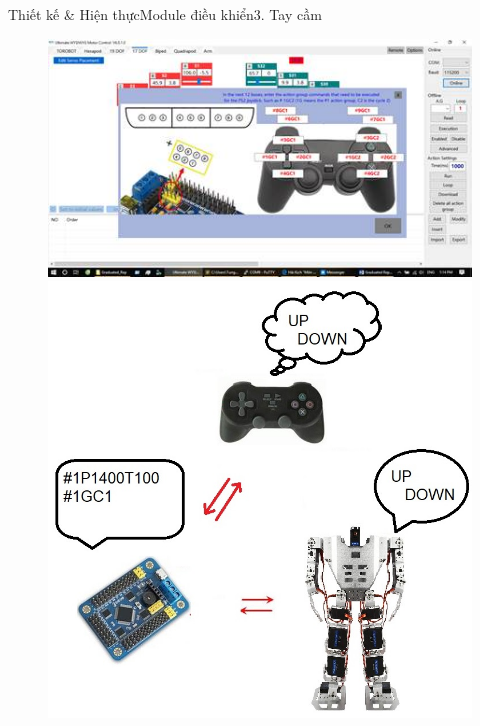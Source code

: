 \documentclass[compress, blue, 13pt,hyperref={pdfpagemode=FullScreen}]{beamer}
\begin{document}
\begin{frame}{Thiết kế \& Hiện thực}{Module điều khiển}{3. Tay cầm}
\begin{figure}[hbtp]
\centering
\includegraphics[scale=0.43]{images/image007.jpg}
\includegraphics[scale=0.25]{images/PS2GamePad.jpg}
\end{figure}
\end{frame}
%
\end{document}
